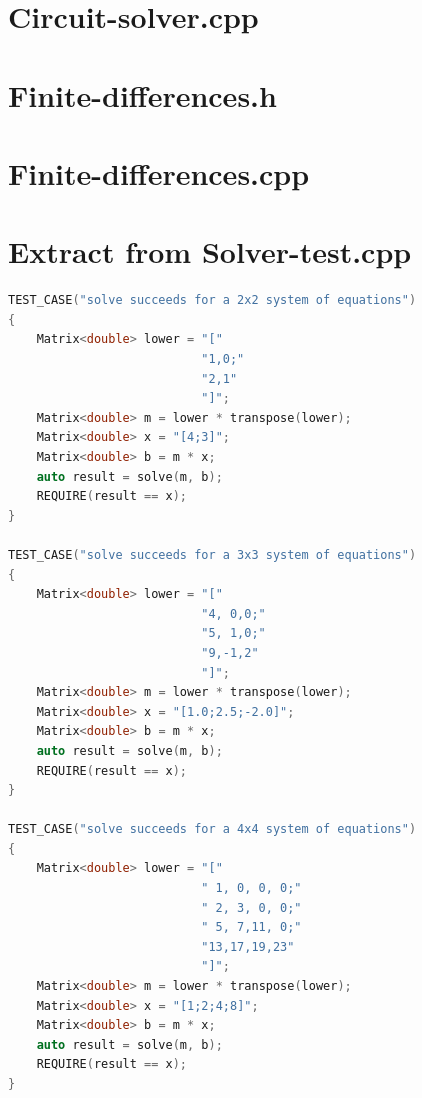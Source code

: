\documentclass[journal,hidelinks]{IEEEtran}
\begin{document}
\begin{appendices}
\section{Circuit-solver.cpp}
\label{sec:circuit-solver-cpp}

\newpage

\section{Finite-differences.h}
\label{sec:finite-differences-h}

\newpage

\section{Finite-differences.cpp}
\label{sec:finite-differences-cpp}

\newpage

\section{Extract from Solver-test.cpp}
\label{sec:solver-test-cpp}
\begin{lstlisting}[language=C++]
TEST_CASE("solve succeeds for a 2x2 system of equations")
{
    Matrix<double> lower = "["
                           "1,0;"
                           "2,1"
                           "]";
    Matrix<double> m = lower * transpose(lower);
    Matrix<double> x = "[4;3]";
    Matrix<double> b = m * x;
    auto result = solve(m, b);
    REQUIRE(result == x);
}

TEST_CASE("solve succeeds for a 3x3 system of equations")
{
    Matrix<double> lower = "["
                           "4, 0,0;"
                           "5, 1,0;"
                           "9,-1,2"
                           "]";
    Matrix<double> m = lower * transpose(lower);
    Matrix<double> x = "[1.0;2.5;-2.0]";
    Matrix<double> b = m * x;
    auto result = solve(m, b);
    REQUIRE(result == x);
}

TEST_CASE("solve succeeds for a 4x4 system of equations")
{
    Matrix<double> lower = "["
                           " 1, 0, 0, 0;"
                           " 2, 3, 0, 0;"
                           " 5, 7,11, 0;"
                           "13,17,19,23"
                           "]";
    Matrix<double> m = lower * transpose(lower);
    Matrix<double> x = "[1;2;4;8]";
    Matrix<double> b = m * x;
    auto result = solve(m, b);
    REQUIRE(result == x);
}


\end{lstlisting}
\end{appendices}
\end{document}
